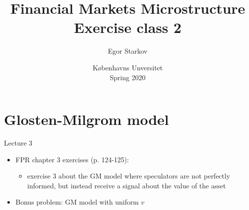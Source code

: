 \documentclass[english,10pt
,aspectratio=169
]{beamer}
\title{Financial Markets Microstructure \\ Exercise class 2}
\author{Egor Starkov}
\date{K{\o}benhavns Unversitet \\
	Spring 2020}
\begin{document}
\addtocounter{framenumber}{-1}



\section{Glosten-Milgrom model}

\begin{frame}{Lecture 3}
	\begin{itemize}
		\item FPR chapter 3 exercises (p. 124-125):
		\begin{itemize}
			\item exercise 3 about the GM model where speculators are not perfectly informed, but instead receive a signal about the value of the asset
		\end{itemize}
		\item Bonus problem: GM model with uniform $v$
	\end{itemize}
\end{frame}
\end{document}
